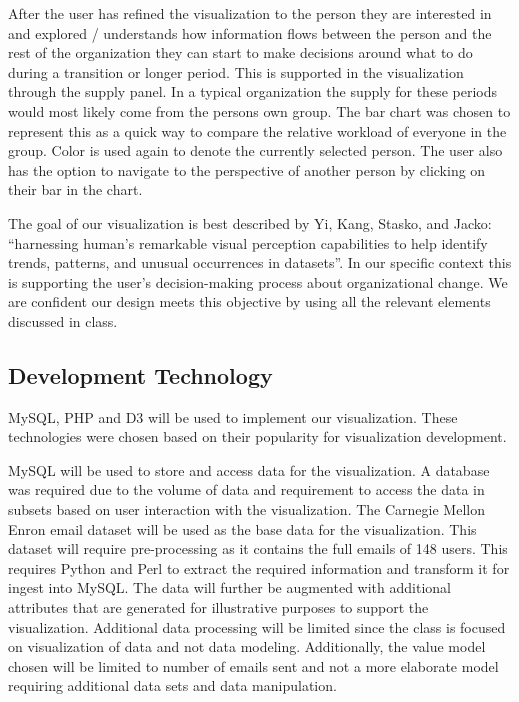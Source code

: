 \documentclass{soups}
\begin{document}
After the user has refined the visualization to the person they are interested in and explored / understands how information flows between the person and the rest of the organization they can start to make decisions around what to do during a transition or longer period.  This is supported in the visualization through the supply panel.  In a typical organization the supply for these periods would most likely come from the persons own group.  The bar chart was chosen to represent this as a quick way to compare the relative workload of everyone in the group.  Color is used again to denote the currently selected person.  The user also has the option to navigate to the perspective of another person by clicking on their bar in the chart.

The goal of our visualization is best described by Yi, Kang, Stasko, and Jacko: “harnessing human’s remarkable visual perception capabilities to help identify trends, patterns, and unusual occurrences in datasets”\cite{yi2007toward}.  In our specific context this is supporting the user’s decision-making process about organizational change.  We are confident our design meets this objective by using all the relevant elements discussed in class.

\subsection{Development Technology}
MySQL, PHP and D3 will be used to implement our visualization.  These technologies were chosen based on their popularity for visualization development.

MySQL will be used to store and access data for the visualization.  A database was required due to the volume of data and requirement to access the data in subsets based on user interaction with the visualization.  The Carnegie Mellon Enron email dataset\cite{cmuenron} will be used as the base data for the visualization.  This dataset will require pre-processing as it contains the full emails of 148 users.  This requires Python and Perl to extract the required information and transform it for ingest into MySQL.  The data will further be augmented with additional attributes that are generated for illustrative purposes to support the visualization.  Additional data processing will be limited since the class is focused on visualization of data and not data modeling.  Additionally, the value model chosen will be limited to number of emails sent and not a more elaborate model requiring additional data sets and data manipulation. 
\end{document}
